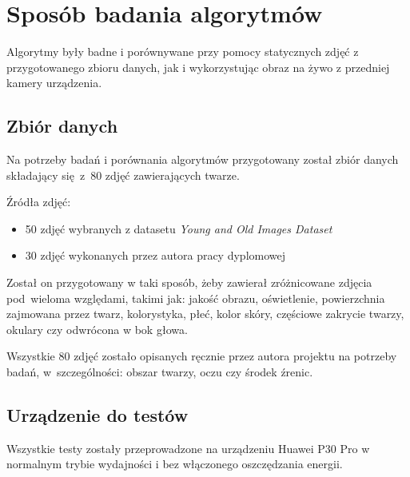 \newpage 

\section{Sposób badania algorytmów}

Algorytmy były badne i porównywane przy pomocy statycznych zdjęć z przygotowanego zbioru danych, jak i wykorzystując obraz na żywo z przedniej kamery urządzenia.

\subsection{Zbiór danych}
\label{section:dataset}
Na potrzeby badań i porównania algorytmów przygotowany został zbiór danych składający się~z~80 zdjęć zawierających twarze. 
\par
Źródła zdjęć:

\begin{itemize}
    \item 50 zdjęć wybranych z datasetu \textit{Young and Old Images Dataset} \cite{young_old_dataset}
    \item 30 zdjęć wykonanych przez autora pracy dyplomowej
\end{itemize}

Został on przygotowany w taki sposób, żeby zawierał zróżnicowane zdjęcia pod~wieloma względami, takimi jak: jakość obrazu, oświetlenie, powierzchnia zajmowana przez twarz, kolorystyka, płeć, kolor skóry, częściowe zakrycie twarzy, okulary czy odwrócona w bok głowa. 

\par

Wszystkie 80 zdjęć zostało opisanych ręcznie przez autora projektu na potrzeby badań, w~szczególności: obszar twarzy, oczu czy środek źrenic. 

\par

\subsection{Urządzenie do testów}

Wszystkie testy zostały przeprowadzone na urządzeniu Huawei P30 Pro w normalnym trybie wydajności i bez włączonego oszczędzania energii. 